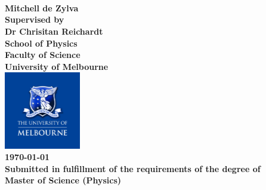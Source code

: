 
\begin{center}
\vspace{2.0cm}
\Huge
\bfseries
{}\\
 \\
\\
\mdseries
\vspace{2.0cm}
\Large{Mitchell de Zylva}\\
\vspace{1.0cm} %
\large{
Supervised by\\
Dr Chrisitan Reichardt\\}
\vspace{4.0cm}
\Large{School of Physics}\\
\large{Faculty of Science}\\
\large{University of Melbourne\\}
\vspace{0.5cm}
\includegraphics[width = 0.25\textwidth]{logo.pdf}\\

\vspace{2.0cm}
\Large{\today \\}
\vspace{0.5cm}
\normalsize
Submitted in fulfillment of the requirements of the degree of\\
Master of Science (Physics)
\end{center}